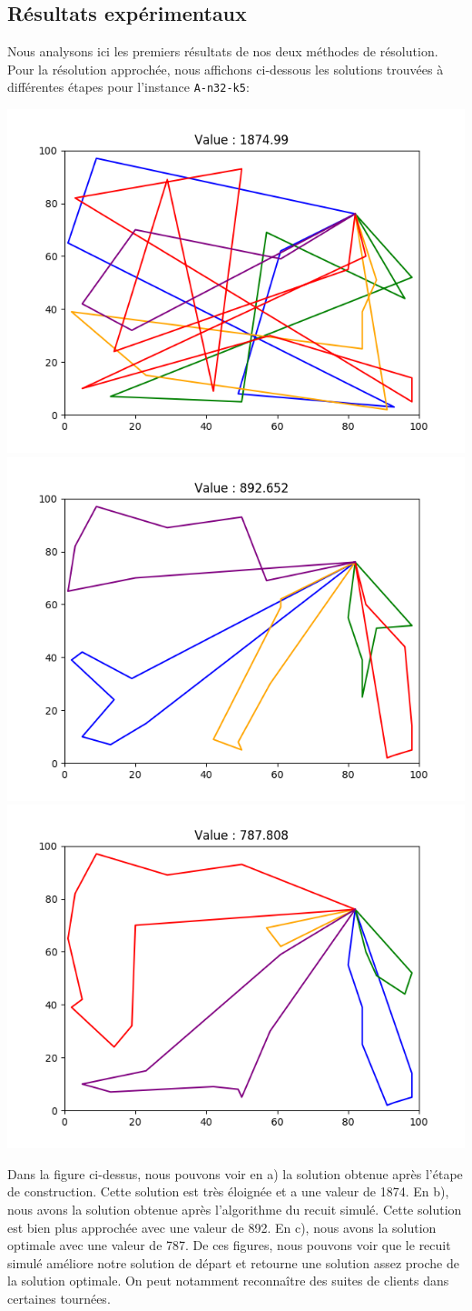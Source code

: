 \subsection{Résultats expérimentaux}
\label{result}
Nous analysons ici les premiers résultats de nos deux méthodes de résolution. Pour la résolution approchée, nous affichons ci-dessous les solutions trouvées à différentes étapes pour l'instance \texttt{A-n32-k5}:

\begin{center}
\includegraphics[width=0.32\linewidth]{pictures/image5.png}
\includegraphics[width=0.32\linewidth]{pictures/image2.png}
\includegraphics[width=0.32\linewidth]{pictures/image3.png}
\end{center}

Dans la figure ci-dessus, nous pouvons voir en a) la solution obtenue après l'étape de construction. Cette solution est très éloignée et a une valeur de 1874. En b), nous avons la solution obtenue après l'algorithme du recuit simulé. Cette solution est bien plus approchée avec une valeur de 892. En c), nous avons la solution optimale avec une valeur de 787. De ces figures, nous pouvons voir que le recuit simulé améliore notre solution de départ et retourne une solution assez proche de la solution optimale. On peut notamment reconnaître des suites de clients dans certaines tournées.\\

